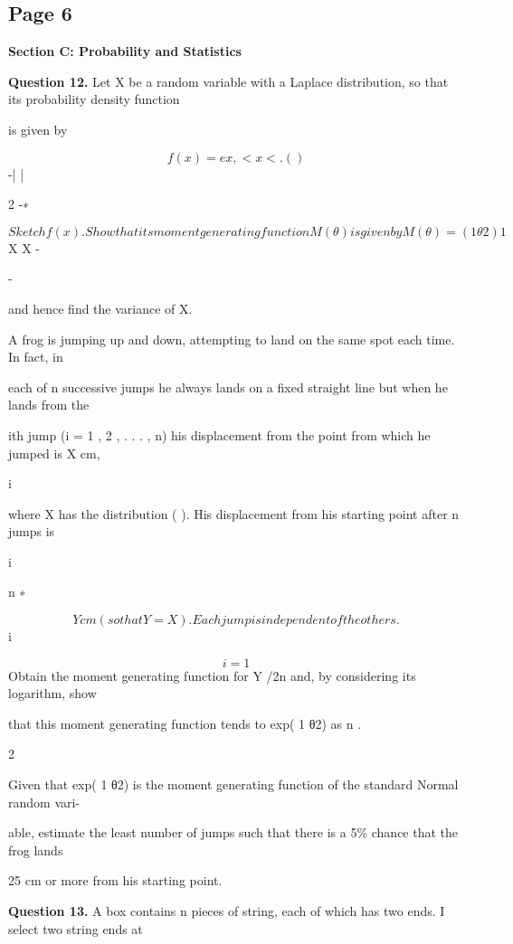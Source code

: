 \documentclass[12pt]{article}
\begin{document}
\subsection*{Page 6}
\begin{flushleft}
\bigskip\textbf{Section C: Probability and Statistics}\par
\bigskip\textbf{Question 12.} Let X be a random variable with a Laplace distribution, so that its probability density function\par
is given by\par
\[f(x) = e x , < x < . ( )\]
-| |\par
2 -\infty \infty ∗\par
\[Sketch f(x). Show that its moment generating function M (θ) is given by M (θ) = (1 θ2) 1\]
X X -\par
-\par
and hence find the variance of X.\par
A frog is jumping up and down, attempting to land on the same spot each time. In fact, in\par
each of n successive jumps he always lands on a fixed straight line but when he lands from the\par
ith jump (i = 1 , 2 , . . . , n) his displacement from the point from which he jumped is X cm,\par
i\par
where X has the distribution ( ). His displacement from his starting point after n jumps is\par
i\par
n ∗\par
\[Y cm (so that Y = X ). Each jump is independent of the others.\]
i\par
\[i=1\]
Obtain the moment generating function for Y /\sqrt2n and, by considering its logarithm, show\par
that this moment generating function tends to exp( 1 θ2) as n .\par
2 \to \infty\par
Given that exp( 1 θ2) is the moment generating function of the standard Normal random vari-\par
able, estimate the least number of jumps such that there is a 5\% chance that the frog lands\par
25 cm or more from his starting point.\par
\bigskip\textbf{Question 13.} A box contains n pieces of string, each of which has two ends. I select two string ends at\par

\end{flushleft}
\end{document}
